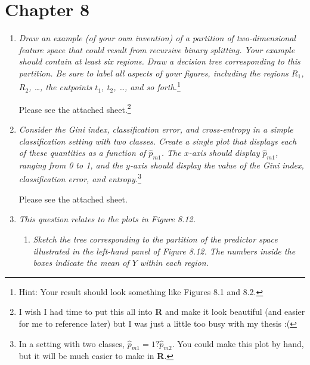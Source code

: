 \documentclass[12pt]{article}
\begin{document}
    
    
\bigskip

\section*{Chapter 8}

\begin{enumerate}
    
    \item \emph{Draw an example (of your own invention) of a partition of two-dimensional feature space that could result from recursive binary splitting. Your example should contain at least six regions. Draw a decision tree corresponding to this partition. Be sure to label all aspects of your figures, including the regions $R_1$, $R_2$, \dots, the cutpoints $t_1$, $t_2$, \dots, and so forth.}\footnote{Hint: Your result should look something like Figures 8.1 and 8.2.}
    
    Please see the attached sheet.\footnote{I wish I had time to put this all into \textbf{R} and make it look beautiful (and easier for me to reference later) but I was just a little too busy with my thesis :(}
    
    \setcounter{enumi}{2}
    \item \emph{Consider the Gini index, classification error, and cross-entropy in a simple classification setting with two classes. Create a single plot that displays each of these quantities as a function of $\hat{p}_{m1}$. The $x$-axis should display $\hat{p}_{m1}$, ranging from 0 to 1, and the $y$-axis should display the value of the Gini index, classification error, and entropy.}\footnote{In a setting with two classes, $\hat{p}_{m1} = 1 ? \hat{p}_{m2}$. You could make this plot by hand, but it will be much easier to make in \textbf{R}.}
    
        Please see the attached sheet. 
        
    \item \emph{This question relates to the plots in Figure 8.12.}
    	\begin{enumerate}
			\item \emph{Sketch the tree corresponding to the partition of the predictor space illustrated in the left-hand panel of Figure 8.12. The numbers inside the boxes indicate the mean of $Y$ within each region.}


\end{enumerate}
\end{enumerate}
\end{document}
